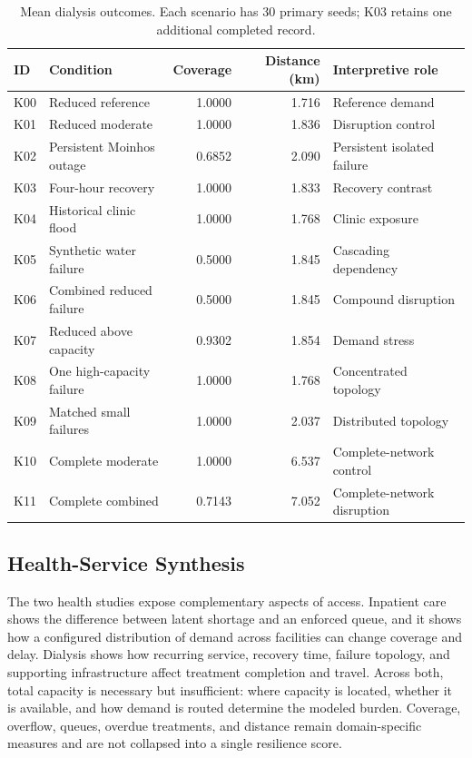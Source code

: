 \documentclass[pdflatex,sn-mathphys-num]{sn-jnl}%
\theoremstyle{thmstyleone}%
\theoremstyle{thmstyletwo}%
\theoremstyle{thmstylethree}%
\begin{document}
\begin{table}[ht]
\centering
\footnotesize
\caption{Mean dialysis outcomes. Each scenario has 30 primary seeds; K03 retains one additional completed record.}
\label{tbl:dialysis_results}
\begin{tabularx}{\linewidth}{@{}llrrX@{}}
\toprule
\textbf{ID} & \textbf{Condition} & \textbf{Coverage} & \textbf{Distance (km)} & \textbf{Interpretive role} \\ \midrule
K00 & Reduced reference & 1.0000 & 1.716 & Reference demand \\ 
K01 & Reduced moderate & 1.0000 & 1.836 & Disruption control \\ 
K02 & Persistent Moinhos outage & 0.6852 & 2.090 & Persistent isolated failure \\ 
K03 & Four-hour recovery & 1.0000 & 1.833 & Recovery contrast \\ 
K04 & Historical clinic flood & 1.0000 & 1.768 & Clinic exposure \\ 
K05 & Synthetic water failure & 0.5000 & 1.845 & Cascading dependency \\ 
K06 & Combined reduced failure & 0.5000 & 1.845 & Compound disruption \\ 
K07 & Reduced above capacity & 0.9302 & 1.854 & Demand stress \\ 
K08 & One high-capacity failure & 1.0000 & 1.768 & Concentrated topology \\ 
K09 & Matched small failures & 1.0000 & 2.037 & Distributed topology \\ 
K10 & Complete moderate & 1.0000 & 6.537 & Complete-network control \\ 
K11 & Complete combined & 0.7143 & 7.052 & Complete-network disruption \\ \bottomrule
\end{tabularx}
\end{table}

\subsection{Health-Service Synthesis}

The two health studies expose complementary aspects of access. Inpatient care shows the difference between latent shortage and an enforced queue, and it shows how a configured distribution of demand across facilities can change coverage and delay. Dialysis shows how recurring service, recovery time, failure topology, and supporting infrastructure affect treatment completion and travel. Across both, total capacity is necessary but insufficient: where capacity is located, whether it is available, and how demand is routed determine the modeled burden. Coverage, overflow, queues, overdue treatments, and distance remain domain-specific measures and are not collapsed into a single resilience score.
\end{document}
